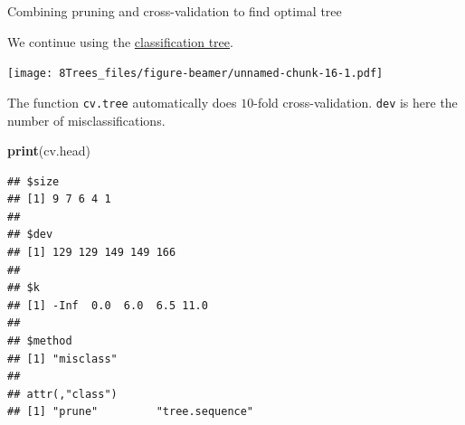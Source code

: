 \documentclass[10pt,ignorenonframetext,]{beamer}
\newenvironment{Shaded}{\begin{snugshade}}{\end{snugshade}}
\newcommand{\KeywordTok}[1]{\textcolor[rgb]{0.13,0.29,0.53}{\textbf{#1}}}
\newcommand{\DataTypeTok}[1]{\textcolor[rgb]{0.13,0.29,0.53}{#1}}
\newcommand{\DecValTok}[1]{\textcolor[rgb]{0.00,0.00,0.81}{#1}}
\newcommand{\StringTok}[1]{\textcolor[rgb]{0.31,0.60,0.02}{#1}}
\newcommand{\OperatorTok}[1]{\textcolor[rgb]{0.81,0.36,0.00}{\textbf{#1}}}
\newcommand{\NormalTok}[1]{#1}
\begin{document}
\begin{frame}[fragile]

\begin{block}{ Combining pruning and cross-validation to find optimal
tree}

We continue using the \href{classtree2}{classification tree}.

\begin{Shaded}
\end{Shaded}

\texttt{[image: 8Trees\_files/figure-beamer/unnamed-chunk-16-1.pdf]}

\end{block}

\end{frame}

\begin{frame}[fragile]

The function \texttt{cv.tree} automatically does \(10\)-fold
cross-validation. \texttt{dev} is here the number of misclassifications.

\begin{Shaded}
\begin{Highlighting}[]
\KeywordTok{print}\NormalTok{(cv.head)}
\end{Highlighting}
\end{Shaded}

\begin{verbatim}
## $size
## [1] 9 7 6 4 1
## 
## $dev
## [1] 129 129 149 149 166
## 
## $k
## [1] -Inf  0.0  6.0  6.5 11.0
## 
## $method
## [1] "misclass"
## 
## attr(,"class")
## [1] "prune"         "tree.sequence"
\end{verbatim}

\end{frame}
\end{document}
